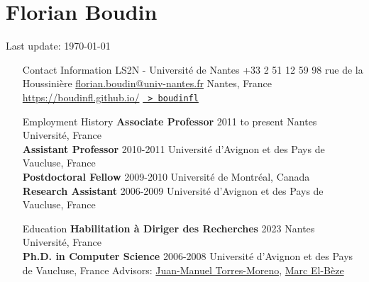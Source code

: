 \documentclass[11pt,a4paper]{article}
\begin{document}
\section*{Florian Boudin}

Last update: \today

\hrulefill

\begin{itemize}
[labelindent=!,
labelsep*=.5cm,
leftmargin=3.1cm,
itemsep=0.3cm,
align=left,
style=multiline,
font=\normalfont\scshape]

\item[Contact Information]
LS2N - Université de Nantes  \hfill +33 2 51 12 59 98  rue de la Houssinière \hfill \url{florian.boudin@univ-nantes.fr}  Nantes, France \hfill \url{https://boudinfl.github.io/} \newline
\phantom{~~} \hfill \href{https://github.com/boudinfl/}{\faGithub \texttt{~>~boudinfl}}

\item[Employment History]
\textbf{Associate Professor} \hfill 2011 to present \newline
Nantes Université, France \\[-.5cm]

\textbf{Assistant Professor} \hfill 2010-2011 \newline
Université d'Avignon et des Pays de Vaucluse, France \\[-.5cm]

\textbf{Postdoctoral Fellow} \hfill 2009-2010 \newline
Université de Montréal, Canada \\[-.5cm]
                                       
\textbf{Research Assistant} \hfill 2006-2009 \newline
Université d'Avignon et des Pays de Vaucluse, France

\item[Education]
\textbf{Habilitation à Diriger des Recherches} \hfill 2023 \newline
Nantes Université, France \\[-.5cm]

\textbf{Ph.D. in Computer Science} \hfill 2006-2008 \newline 
Université d'Avignon et des Pays de Vaucluse, France \newline
Advisors: 
\href{http://lia.univ-avignon.fr/chercheurs/torres/}{Juan-Manuel Torres-Moreno},
\href{http://lia.univ-avignon.fr/user/48}{Marc El-Bèze} \\[-.5cm]


\end{itemize}
\end{document}
